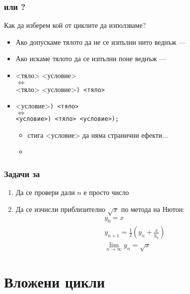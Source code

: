\documentclass[alsotrans]{beamerswitch}
\begin{document}
\begin{frame}
  \frametitle{ или ?}

  Как да изберем кой от циклите да използваме?
  \begin{itemize}[<+->]
  \item Ако допускаме тялото да не се изпълни нито веднъж --- 
  \item Ако искаме тялото да се изпълни поне веднъж --- 
  \item {} <тяло> <условие>\lst{);}\\
    $\Leftrightarrow$\\
    <тяло> <условие>\tt) <тяло>
  \item {}<условие>\tt) <тяло>\\
    $\Leftrightarrow$\\
    <условие>\tt) <тяло> <условие>\tt{);}
    \begin{itemize}
    \item \alert{стига <условие> да няма странични ефекти...}
    \item \exa {}
    \end{itemize}
  \end{itemize}
\end{frame}

\begin{frame}
  \frametitle{Задачи за }

  \begin{enumerate}[<+->]
  \item Да се провери дали $n$ е просто число
  \item Да се изчисли приблизително $\sqrt x$ по метода на Нютон:
    \begin{equation*}
      \begin{array}{l}
      y_0 = x\\
      y_{n+1} = \frac12\left(y_n + \frac x{y_n}\right)\\
      \lim_{n\to\infty}\limits y_n = \sqrt x
      \end{array}
    \end{equation*}
  \end{enumerate}
\end{frame}

\section{Вложени цикли}
\end{document}
